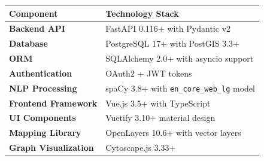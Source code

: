 \documentclass[a0,portrait]{a0poster}
\begin{document}
\begin{multicols}{3}
	\vspace{0.5cm}
	\begin{tcolorbox}[techbox, title={\Large\textbf{Technical Specifications}}]
		\vspace{0.5cm}
		\centering
		\begin{tabular}{@{}ll@{}}
			\toprule
			\textbf{Component}           & \textbf{Technology Stack}                        \\
			\midrule
			\textbf{Backend API}         & FastAPI 0.116+ with Pydantic v2                  \\
			\textbf{Database}            & PostgreSQL 17+ with PostGIS 3.3+                 \\
			\textbf{ORM}                 & SQLAlchemy 2.0+ with asyncio support             \\
			\textbf{Authentication}      & OAuth2 + JWT tokens                              \\
			\textbf{NLP Processing}      & spaCy 3.8+ with \texttt{en\_core\_web\_lg} model \\
			\textbf{Frontend Framework}  & Vue.js 3.5+ with TypeScript                      \\
			\textbf{UI Components}       & Vuetify 3.10+ material design                    \\
			\textbf{Mapping Library}     & OpenLayers 10.6+ with vector layers              \\
			\textbf{Graph Visualization} & Cytoscape.js 3.33+                               \\
			\bottomrule
		\end{tabular}
		\vspace{0.5cm}
	\end{tcolorbox}

	\vspace{0.5cm}




\end{multicols}
\end{document}
